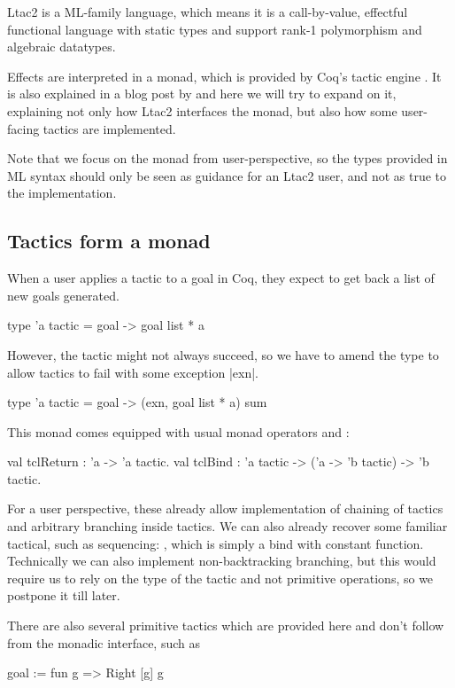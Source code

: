 Ltac2 is a ML-family language, which means it is a call-by-value, effectful functional language with static types and support rank-1 polymorphism and algebraic datatypes.

Effects are interpreted in a monad, which is provided by Coq's tactic engine \cite{spiwackAbstractTypeConstructing2010}.
It is also explained in a blog post by \citet{pedrotCoqHoTTminuteTickingClockwork2016} and here we will try to expand on it, explaining not only how Ltac2 interfaces the monad, but also how some user-facing tactics are implemented.

Note that we focus on the monad from user-perspective, so the types provided in ML syntax should only be seen as guidance for an Ltac2 user, and not as true to the implementation.

\subsection{Tactics form a monad}
\label{sec:monad-tactics}

When a user applies a tactic to a goal in Coq, they expect to get back a list of new goals generated.
\begin{ocaml}
type 'a tactic = goal -> goal list * a
\end{ocaml}

However, the tactic might not always succeed, so we have to amend the type to allow tactics to fail with some exception \ocamle|exn|.
\begin{ocaml}
type 'a tactic = goal -> (exn, goal list * a) sum
\end{ocaml}

This monad comes equipped with usual monad operators  and :
\begin{ocaml}
val tclReturn : 'a -> 'a tactic.
val tclBind : 'a tactic -> ('a -> 'b tactic) -> 'b tactic.
\end{ocaml}

For a user perspective, these already allow implementation of chaining of tactics and arbitrary branching inside tactics.
We can also already recover some familiar tactical, such as sequencing: , which is simply a bind with constant function.
Technically we can also implement non-backtracking branching, but this would require us to rely on the type of the tactic and not primitive operations, so we postpone it till later.

There are also several primitive tactics which are provided here and don't follow from the monadic interface, such as
\begin{coqe}
goal := fun g => Right [g] g
\end{coqe}


